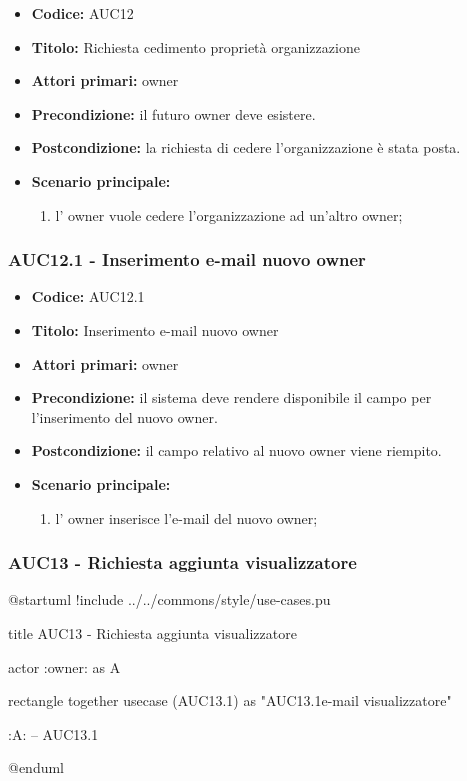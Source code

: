 \documentclass[casi-duso]{subfiles}
\begin{document}
\begin{itemize}
  \item \textbf{Codice:} AUC12
  \item \textbf{Titolo:} Richiesta cedimento proprietà organizzazione
  \item \textbf{Attori primari:} owner
  \item \textbf{Precondizione:} il futuro owner deve esistere.
  \item \textbf{Postcondizione:} la richiesta di cedere l'organizzazione è stata posta.
  \item \textbf{Scenario principale:} 
  \begin{enumerate}
    \item l' owner vuole cedere l'organizzazione ad un'altro owner;
  \end{enumerate}
\end{itemize}

\subsubsection{AUC12.1 - Inserimento e-mail nuovo owner}%
\label{subsub:AUC12.1}
\begin{itemize}
  \item \textbf{Codice:} AUC12.1
  \item \textbf{Titolo:} Inserimento e-mail nuovo owner
  \item \textbf{Attori primari:} owner
  \item \textbf{Precondizione:} il sistema deve rendere disponibile il campo per l'inserimento del nuovo owner.
  \item \textbf{Postcondizione:} il campo relativo al nuovo owner viene riempito.
  \item \textbf{Scenario principale:} 
  \begin{enumerate}
    \item l' owner inserisce l'e-mail del nuovo owner;
  \end{enumerate}
\end{itemize}

\subsubsection{AUC13 - Richiesta aggiunta visualizzatore}%
\label{subsub:AUC13}

\begin{plantuml}
@startuml
!include ../../commons/style/use-cases.pu

title AUC13 - Richiesta aggiunta visualizzatore

actor :owner: as A

rectangle {
  together {
    usecase (AUC13.1) as "AUC13.1\nInserimento e-mail visualizzatore"
  }
}

:A: -- AUC13.1

@enduml
\end{plantuml}
\end{document}
